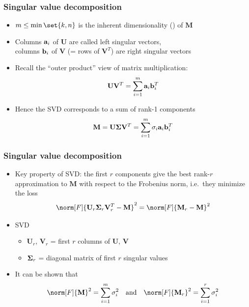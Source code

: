 \documentclass[t]{beamer} %
\begin{document}
\begin{frame}
  \frametitle{Singular value decomposition}

  \begin{itemize}
  \item $m \leq \min \set{k, n}$ is the inherent dimensionality () of $\mathbf{M}$
  \item Columns $\va_i$ of $\mathbf{U}$ are called left singular vectors,\\
    columns $\vb_i$ of $\mathbf{V}$ (= rows of $\mathbf{V}^T$) are right singular vectors
  \item<2-> Recall the ``outer product'' view of matrix multiplication:
    \[
      \mathbf{U} \mathbf{V}^T = \sum_{i=1}^m \va_i \vb_i^T
    \]
  \item<3-> Hence the SVD corresponds to a sum of rank-1 components
    \[
      \mathbf{M} = \mathbf{U} \Msigma \mathbf{V}^T = \sum_{i=1}^m \sigma_i \va_i \vb_i^T
    \]
  \end{itemize}
\end{frame}

\begin{frame}
  \frametitle{Singular value decomposition}

  \begin{itemize}
  \item Key property of SVD: the first $r$ components give the best rank-$r$
    approximation to $\mathbf{M}$ with respect to the Frobenius norm, i.e.\ they minimize the loss
    \[
      \norm[F]{ \mathbf{U}_r \Msigma_r \mathbf{V}_r^T - \mathbf{M} }^2
      = \norm[F]{ \mathbf{M}_r - \mathbf{M} }^2
    \]
  \item[\hand]  SVD
    \begin{itemize}
    \item $\mathbf{U}_r$, $\mathbf{V}_r$ = first $r$ columns of $\mathbf{U}$, $\mathbf{V}$
    \item $\boldsymbol{\Sigma}_r$ = diagonal matrix of first $r$ singular values
    \end{itemize}
  \item<2-> It can be shown that
    \[
      \norm[F]{ \mathbf{M} }^2 = \sum_{i=1}^m \sigma_i^2 \quad \text{and} \quad
      \norm[F]{ \mathbf{M}_r }^2 = \sum_{i=1}^r \sigma_i^2      
    \]
  \end{itemize}
\end{frame}
\end{document}
